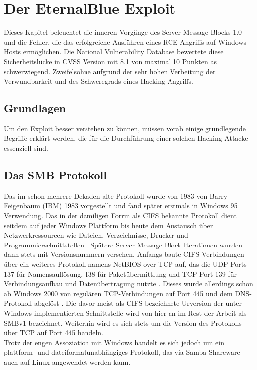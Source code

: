 \documentclass[DIV=12,headings=normal,pdftex,headinclude=false,footinclude=false,final]{scrreprt}
\begin{document}
\chapter{Der EternalBlue Exploit}
Dieses Kapitel beleuchtet die inneren Vorgänge des Server Message Blocks 1.0 und die Fehler, die das erfolgreiche Ausführen eines RCE Angriffs auf Windows Hosts ermöglichen. Die National Vulnerability Database bewertete diese Sicherheitslücke in CVSS Version mit 8.1 von maximal 10 Punkten \cite{NVD} as schwerwiegend. Zweifelsohne aufgrund der sehr hohen Verbeitung der Verwundbarkeit und des Schweregrads eines Hacking-Angriffs. 

\section{Grundlagen}
Um den Exploit besser verstehen zu können, müssen vorab einige grundlegende Begriffe erklärt werden, die für die Durchführung einer solchen Hacking Attacke essenziell sind.

\section{Das SMB Protokoll}
Das im schon mehrere Dekaden alte Protokoll wurde von 1983 von Barry Feigenbaum (IBM) 1983 vorgestellt und fand später erstmals in Windows 95 Verwendung. Das in der damiligen Forrm als CIFS bekannte Protokoll dient seitdem auf jeder Windows Plattform bis heute dem Austausch über Netzwerkressourcen wie Dateien, Verzeichnisse, Drucker und Programmierschnittstellen \cite{CompWeek:SMB}. Spätere Server Message Block Iterationen wurden dann stets mit Versionsnummern versehen. Anfangs baute CIFS Verbindungen über ein weiteres Protokoll namens NetBIOS over TCP auf, das die UDP Ports 137 für Namensauflösung, 138 für Paketübermittlung und TCP-Port 139 für Verbindungsaufbau und Datenübertragung nutzte \cite{MS:NetBIOS}. Dieses wurde allerdings schon ab Windows 2000 von regulären TCP-Verbindungen auf Port 445 und dem DNS-Protokoll abgelöst \cite{IONOS}. Die davor meist als CIFS bezeichnete Urversion der unter Windows implementierten Schnittstelle wird von hier an im Rest der Arbeit als SMBv1 bezeichnet. Weiterhin wird es sich stets um die Version des Protokolls über TCP auf Port 445 handeln.\\
Trotz der engen Assoziation mit Windows handelt es sich jedoch um ein plattform- und dateiformatunabhängiges Protokoll, das via Samba Shareware auch auf Linux angewendet werden kann\cite{IONOS}. 
\end{document}

